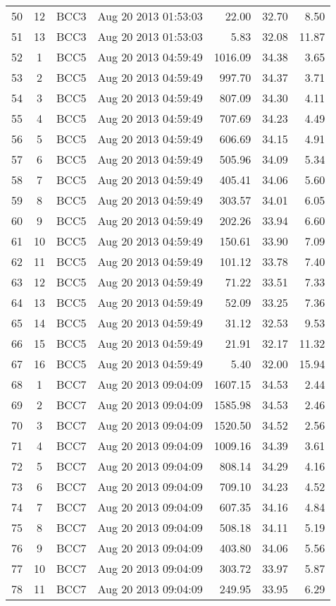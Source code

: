 \begin{longtable}{ccllrrr}
50&12&BCC3&Aug 20 2013 01:53:03&22.00&32.70&8.50\\
51&13&BCC3&Aug 20 2013 01:53:03&5.83&32.08&11.87\\
\hline 
52&1&BCC5&Aug 20 2013 04:59:49&1016.09&34.38&3.65\\
53&2&BCC5&Aug 20 2013 04:59:49&997.70&34.37&3.71\\
54&3&BCC5&Aug 20 2013 04:59:49&807.09&34.30&4.11\\
55&4&BCC5&Aug 20 2013 04:59:49&707.69&34.23&4.49\\
56&5&BCC5&Aug 20 2013 04:59:49&606.69&34.15&4.91\\
57&6&BCC5&Aug 20 2013 04:59:49&505.96&34.09&5.34\\
58&7&BCC5&Aug 20 2013 04:59:49&405.41&34.06&5.60\\
59&8&BCC5&Aug 20 2013 04:59:49&303.57&34.01&6.05\\
60&9&BCC5&Aug 20 2013 04:59:49&202.26&33.94&6.60\\
61&10&BCC5&Aug 20 2013 04:59:49&150.61&33.90&7.09\\
62&11&BCC5&Aug 20 2013 04:59:49&101.12&33.78&7.40\\
63&12&BCC5&Aug 20 2013 04:59:49&71.22&33.51&7.33\\
64&13&BCC5&Aug 20 2013 04:59:49&52.09&33.25&7.36\\
65&14&BCC5&Aug 20 2013 04:59:49&31.12&32.53&9.53\\
66&15&BCC5&Aug 20 2013 04:59:49&21.91&32.17&11.32\\
67&16&BCC5&Aug 20 2013 04:59:49&5.40&32.00&15.94\\
\hline 
68&1&BCC7&Aug 20 2013 09:04:09&1607.15&34.53&2.44\\
69&2&BCC7&Aug 20 2013 09:04:09&1585.98&34.53&2.46\\
70&3&BCC7&Aug 20 2013 09:04:09&1520.50&34.52&2.56\\
71&4&BCC7&Aug 20 2013 09:04:09&1009.16&34.39&3.61\\
72&5&BCC7&Aug 20 2013 09:04:09&808.14&34.29&4.16\\
73&6&BCC7&Aug 20 2013 09:04:09&709.10&34.23&4.52\\
74&7&BCC7&Aug 20 2013 09:04:09&607.35&34.16&4.84\\
75&8&BCC7&Aug 20 2013 09:04:09&508.18&34.11&5.19\\
76&9&BCC7&Aug 20 2013 09:04:09&403.80&34.06&5.56\\
77&10&BCC7&Aug 20 2013 09:04:09&303.72&33.97&5.87\\
78&11&BCC7&Aug 20 2013 09:04:09&249.95&33.95&6.29\\

\end{longtable}
